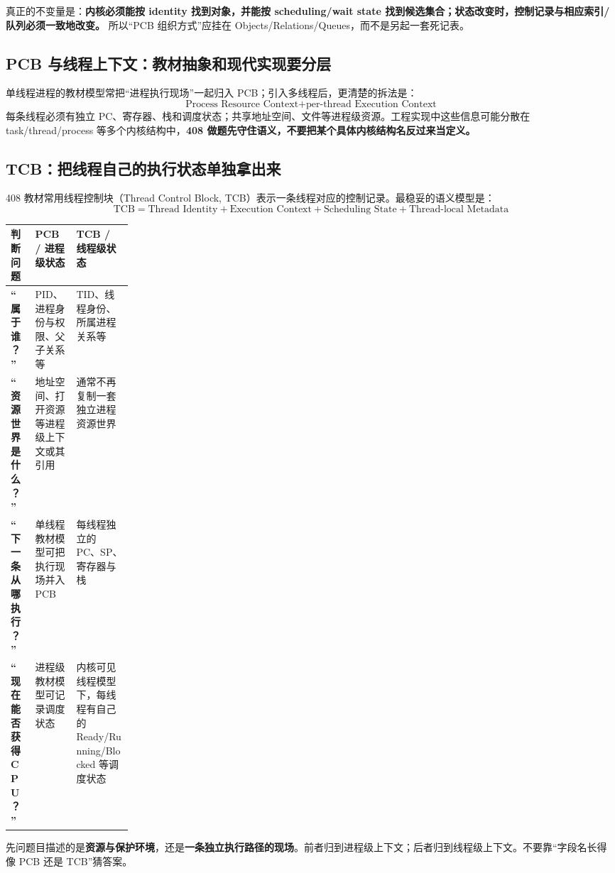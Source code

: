\documentclass[11pt,a4paper]{ctexart}
\newcommand{\kw}[1]{\textbf{#1}}
\begin{document}
真正的不变量是：\kw{内核必须能按 identity 找到对象，并能按 scheduling/wait state 找到候选集合；状态改变时，控制记录与相应索引/队列必须一致地改变。} 所以“PCB 组织方式”应挂在 Objects/Relations/Queues，而不是另起一套死记表。

\subsection{PCB 与线程上下文：教材抽象和现代实现要分层}

单线程进程的教材模型常把“进程执行现场”一起归入 PCB；引入多线程后，更清楚的拆法是：
\[
\boxed{\text{Process Resource Context}+\text{per-thread Execution Context}}
\]
每条线程必须有独立 PC、寄存器、栈和调度状态；共享地址空间、文件等进程级资源。工程实现中这些信息可能分散在 task/thread/process 等多个内核结构中，\kw{408 做题先守住语义，不要把某个具体内核结构名反过来当定义。}

\subsection{TCB：把线程自己的执行状态单独拿出来}

408 教材常用线程控制块（Thread Control Block, TCB）表示一条线程对应的控制记录。最稳妥的语义模型是：
\[
\boxed{
\text{TCB}
=
\text{Thread Identity}
+
\text{Execution Context}
+
\text{Scheduling State}
+
\text{Thread-local Metadata}
}
\]

\begingroup
\small
\renewcommand{\arraystretch}{1.22}
\setlength{\tabcolsep}{5pt}
\begin{tabularx}{\linewidth}{>{\bfseries}p{0.20\linewidth} X X}
\toprule
判断问题 & PCB / 进程级状态 & TCB / 线程级状态\\
\midrule
“属于谁？” & PID、进程身份与权限、父子关系等 & TID、线程身份、所属进程关系等\\
“资源世界是什么？” & 地址空间、打开资源等进程级上下文或其引用 & 通常不再复制一套独立进程资源世界\\
“下一条从哪执行？” & 单线程教材模型可把执行现场并入 PCB & 每线程独立的 PC、SP、寄存器与栈\\
“现在能否获得 CPU？” & 进程级教材模型可记录调度状态 & 内核可见线程模型下，每线程有自己的 Ready/Running/Blocked 等调度状态\\
\bottomrule
\end{tabularx}
\endgroup

\begin{corebox}
先问题目描述的是\kw{资源与保护环境}，还是\kw{一条独立执行路径的现场}。前者归到进程级上下文；后者归到线程级上下文。不要靠“字段名长得像 PCB 还是 TCB”猜答案。
\end{corebox}
\end{document}
